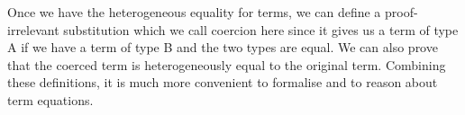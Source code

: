 \documentclass{acm_proc_article-sp}
\begin{document}
Once we have the heterogeneous equality for terms, we can define a proof-irrelevant substitution which we call coercion here
since it gives us a term of type A if we have a term of type B and the
two types are equal. We can also prove that the coerced term is heterogeneously equal to the
original term. Combining these definitions, it is much
more convenient to formalise and to reason about term equations.
\end{document}
